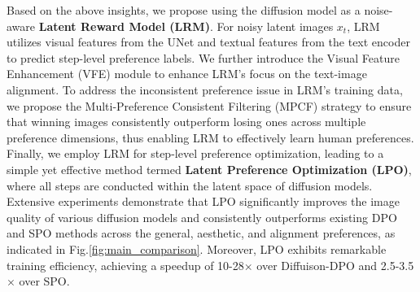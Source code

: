 Based on the above insights, we propose using the diffusion model as a noise-aware \textbf{Latent Reward Model (LRM)}. For noisy latent images $x_t$, LRM utilizes visual features from the UNet \cite{unet} and textual features from the text encoder to predict step-level preference labels. We further introduce the Visual Feature Enhancement (VFE) module to enhance LRM's focus on the text-image alignment. To address the inconsistent preference issue in LRM's training data, we propose the Multi-Preference Consistent Filtering (MPCF) strategy to ensure that winning images consistently outperform losing ones across multiple preference dimensions, thus enabling LRM to effectively learn human preferences. Finally, we employ LRM for step-level preference optimization, leading to a simple yet effective method termed \textbf{Latent Preference Optimization (LPO)}, where all steps are conducted within the latent space of diffusion models. 
Extensive experiments demonstrate that LPO significantly improves the image quality of various diffusion models and consistently outperforms existing DPO and SPO methods across the general, aesthetic, and alignment preferences, as indicated in Fig.\;\ref{fig:main_comparison}. Moreover, LPO exhibits remarkable training efficiency, achieving a speedup of 10-28$\times$ over Diffuison-DPO and 2.5-3.5$\times$ over SPO.